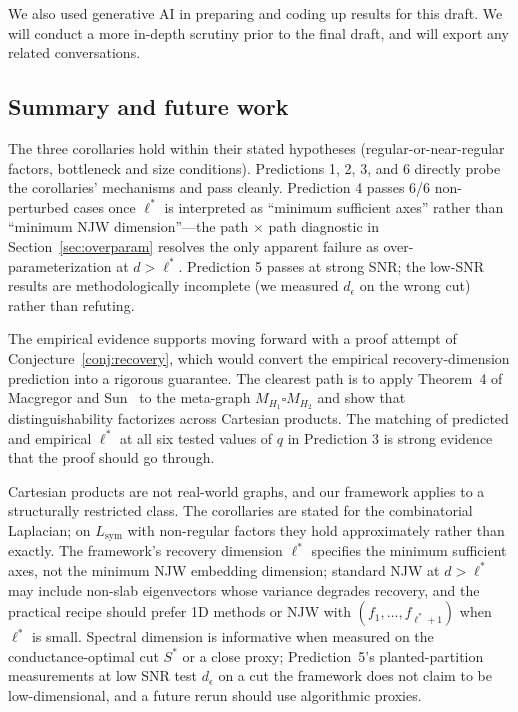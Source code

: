 \documentclass{article}
\theoremstyle{definition}
\theoremstyle{remark}
\begin{document}
We also used generative AI in preparing and coding up results for this draft. We will conduct a more in-depth scrutiny prior to the final draft, and will export any related conversations.

\subsection{Summary and future work}

The three corollaries hold within their stated hypotheses (regular-or-near-regular factors, bottleneck and size conditions). Predictions 1, 2, 3, and 6 directly probe the corollaries' mechanisms and pass cleanly. Prediction 4 passes 6/6 non-perturbed cases once $\ell^*$ is interpreted as ``minimum sufficient axes'' rather than ``minimum NJW dimension''---the path $\times$ path diagnostic in Section~\ref{sec:overparam} resolves the only apparent failure as over-parameterization at $d > \ell^*$. Prediction 5 passes at strong SNR; the low-SNR results are methodologically incomplete (we measured $d_\epsilon$ on the wrong cut) rather than refuting.

The empirical evidence supports moving forward with a proof attempt of Conjecture~\ref{conj:recovery}, which would convert the empirical recovery-dimension prediction into a rigorous guarantee. The clearest path is to apply Theorem~4 of Macgregor and Sun~\cite{macgregor2022tighter} to the meta-graph $M_{H_1} \square M_{H_2}$ and show that distinguishability factorizes across Cartesian products. The matching of predicted and empirical $\ell^*$ at all six tested values of $q$ in Prediction 3 is strong evidence that the proof should go through.

Cartesian products are not real-world graphs, and our framework applies to a structurally restricted class. The corollaries are stated for the combinatorial Laplacian; on $L_{\mathrm{sym}}$ with non-regular factors they hold approximately rather than exactly. The framework's recovery dimension $\ell^*$ specifies the minimum sufficient axes, not the minimum NJW embedding dimension; standard NJW at $d > \ell^*$ may include non-slab eigenvectors whose variance degrades recovery, and the practical recipe should prefer 1D methods or NJW with $(f_1, \ldots, f_{\ell^*+1})$ when $\ell^*$ is small. Spectral dimension is informative when measured on the conductance-optimal cut $S^*$ or a close proxy; Prediction~5's planted-partition measurements at low SNR test $d_\epsilon$ on a cut the framework does not claim to be low-dimensional, and a future rerun should use algorithmic proxies.
\end{document}
